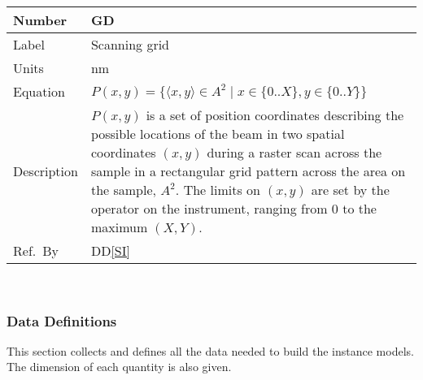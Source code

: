 \documentclass[12pt]{article}
\newcommand{\colAwidth}{0.13\textwidth}
\newcommand{\colBwidth}{0.82\textwidth}
\newcounter{defnum} %
\newcommand{\ddref}[1]{DD\ref{#1}}
\begin{document}
\noindent
\begin{minipage}{\textwidth}
	\renewcommand*{\arraystretch}{1.5}
	\begin{tabular}{| p{\colAwidth} | p{\colBwidth}|}
		\hline
		\rowcolor[gray]{0.9}
		Number& GD{defnum}\thedefnum \label{grid}\\
		\hline
		Label & Scanning grid  \\
		\hline
		Units& \si{\nano\metre}\\
		\hline
		Equation& $P(x,y) = \{\langle x, y \rangle \in A^2 \mid x \in \{0..X\}, y \in \{0..Y\} \}$\\
		\hline
		Description & $P(x,y)$ is a set of position coordinates describing the possible locations of the beam in two spatial coordinates $(x, y)$ during a raster scan across the sample in a rectangular grid pattern across the area on the sample, $A^2$. The limits on $(x,y)$ are set by the operator on the instrument, ranging from 0 to the maximum $(X,Y)$.
		\\
		  \hline
		  Ref.\ By & \ddref{SI}\\
		  \hline
	\end{tabular}
\end{minipage}\\

\subsubsection{Data Definitions}\label{sec_datadef}

This section collects and defines all the data needed to build the instance
models. The dimension of each quantity is also given.  

~\newline
\end{document}

